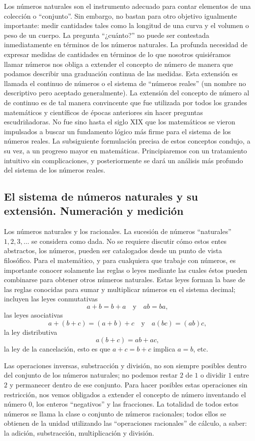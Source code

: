 \documentclass[12pt]{book}
\theoremstyle{definition}
\begin{document}
Los números naturales son el instrumento adecuado para contar elementos de una colección o ``conjunto''. Sin embargo, no bastan para otro objetivo igualmente importante: medir cantidades tales como la longitud de una curva y el volumen o peso de un cuerpo. La pregunta ``¿cuánto?'' no puede ser contestada inmediatamente en términos de los números naturales. La profunda necesidad de expresar medidas de cantidades en términos de lo que nosotros quisiéramos llamar números nos obliga a extender el concepto de número de manera que podamos describir una graduación continua de las medidas. Esta extensión es llamada el continuo de números o el sistema de ``números reales'' (un nombre no descriptivo pero aceptado generalmente). La extensión del concepto de número al de continuo es de tal manera convincente que fue utilizada por todos los grandes matemáticos y científicos de épocas anteriores sin hacer preguntas escudriñadoras. No fue sino hasta el siglo XIX que los matemáticos se vieron impulsados a buscar un fundamento lógico más firme para el sistema de los números reales. La subsiguiente formulación precisa de estos conceptos condujo, a su vez, a un progreso mayor en matemáticas. Principiaremos con un tratamiento intuitivo sin complicaciones, y posteriormente se dará un análisis más profundo del sistema de los números reales.

\subsection{El sistema de números naturales y su extensión. Numeración y medición}

Los números naturales y los racionales. La sucesión de números ``naturales'' $1, 2, 3, \dots$ se considera como dada. No se requiere discutir cómo estos entes abstractos, los números, pueden ser catalogados desde un punto de vista filosófico. Para el matemático, y para cualquiera que trabaje con números, es importante conocer solamente las reglas o leyes mediante las cuales éstos pueden combinarse para obtener otros números naturales. Estas leyes forman la base de las reglas conocidas para sumar y multiplicar números en el sistema decimal; incluyen las leyes conmutativas
\[
a + b = b + a \quad \text{y} \quad ab = ba,
\]
las leyes asociativas
\[
a + (b + c) = (a + b) + c \quad \text{y} \quad a(bc) = (ab)c,
\]
la ley distributiva
\[
a(b + c) = ab + ac,
\]
la ley de la cancelación, esto es que $a + c = b + c$ implica $a = b$, etc.

Las operaciones inversas, substracción y división, no son siempre posibles dentro del conjunto de los números naturales; no podemos restar $2$ de $1$ o dividir $1$ entre $2$ y permanecer dentro de ese conjunto. Para hacer posibles estas operaciones sin restricción, nos vemos obligados a extender el concepto de número inventando el número $0$, los enteros ``negativos'' y las fracciones. La totalidad de todos estos números se llama la clase o conjunto de números racionales; todos ellos se obtienen de la unidad utilizando las ``operaciones racionales'' de cálculo, a saber: la adición, substracción, multiplicación y división.
\end{document}
